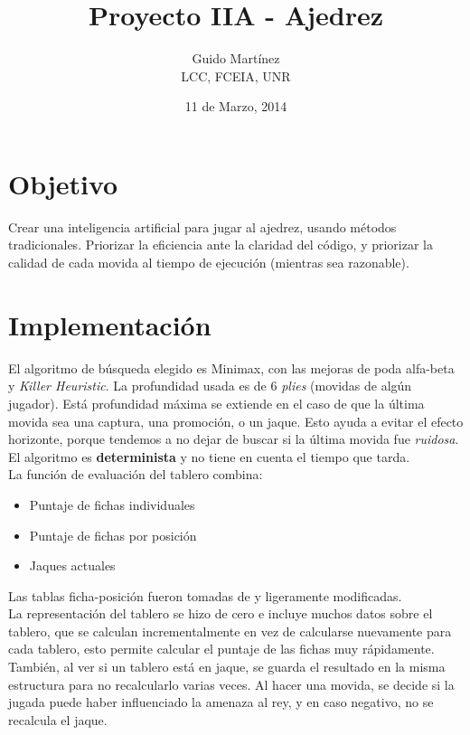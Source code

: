 \documentclass{article}
\begin{document}
\title{Proyecto IIA - Ajedrez}
\date{11 de Marzo, 2014}

\author{Guido Martínez \\ LCC, FCEIA, UNR }

\maketitle

\section{Objetivo}

Crear una inteligencia artificial para jugar al ajedrez, usando métodos tradicionales. Priorizar la eficiencia ante la claridad del código, y priorizar la calidad de cada movida al tiempo de ejecución (mientras sea razonable).

\section{Implementación}

El algoritmo de búsqueda elegido es Minimax, con las mejoras de poda alfa-beta y {\it Killer Heuristic}.
La profundidad usada es de 6  {\it plies} (movidas de algún jugador).
Está profundidad máxima se extiende en el caso de que la última movida sea una captura, una promoción, o un jaque.
Esto ayuda a evitar el efecto horizonte, porque tendemos a no dejar de buscar si la última movida fue {\it ruidosa}. 
El algoritmo es {\bf determinista} y no tiene en cuenta el tiempo que tarda.\\

La función de evaluación del tablero combina:
\begin{itemize}
\item Puntaje de fichas individuales
\item Puntaje de fichas por posición
\item Jaques actuales
\end{itemize}

Las tablas ficha-posición fueron tomadas de \cite{piece-square-table} y ligeramente modificadas.\\

La representación del tablero se hizo de cero e incluye muchos datos sobre el tablero, que se calculan incrementalmente en vez de calcularse nuevamente para cada tablero, esto permite calcular el puntaje de las fichas muy rápidamente.
También, al ver si un tablero está en jaque, se guarda el resultado en la misma estructura para no recalcularlo varias veces.
Al hacer una movida, se decide si la jugada puede haber influenciado la amenaza al rey, y en caso negativo, no se recalcula el jaque.
\end{document}
